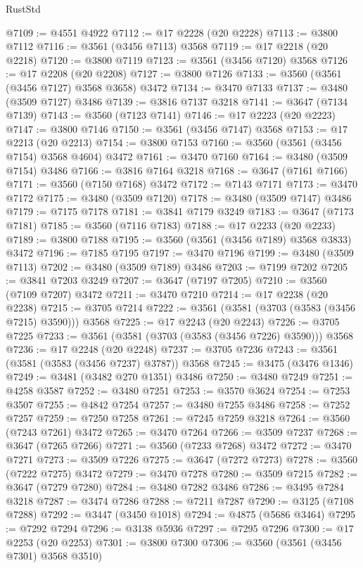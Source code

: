 \begin{lexlean}{RustStd}
\begin{coremodule}
@7109 := @4551 @4922
@7112 := @17 @2228 (@20 @2228)
@7113 := @3800 @7112
@7116 := @3561 (@3456 @7113) @3568
@7119 := @17 @2218 (@20 @2218)
@7120 := @3800 @7119
@7123 := @3561 (@3456 @7120) @3568
@7126 := @17 @2208 (@20 @2208)
@7127 := @3800 @7126
@7133 := @3560 (@3561 (@3456 @7127) @3568 @3658) @3472
@7134 := @3470 @7133
@7137 := @3480 (@3509 @7127) @3486
@7139 := @3816 @7137 @3218
@7141 := @3647 (@7134 @7139)
@7143 := @3560 (@7123 @7141)
@7146 := @17 @2223 (@20 @2223)
@7147 := @3800 @7146
@7150 := @3561 (@3456 @7147) @3568
@7153 := @17 @2213 (@20 @2213)
@7154 := @3800 @7153
@7160 := @3560 (@3561 (@3456 @7154) @3568 @4604) @3472
@7161 := @3470 @7160
@7164 := @3480 (@3509 @7154) @3486
@7166 := @3816 @7164 @3218
@7168 := @3647 (@7161 @7166)
@7171 := @3560 (@7150 @7168) @3472
@7172 := @7143 @7171
@7173 := @3470 @7172
@7175 := @3480 (@3509 @7120)
@7178 := @3480 (@3509 @7147) @3486
@7179 := @7175 @7178
@7181 := @3841 @7179 @3249
@7183 := @3647 (@7173 @7181)
@7185 := @3560 (@7116 @7183)
@7188 := @17 @2233 (@20 @2233)
@7189 := @3800 @7188
@7195 := @3560 (@3561 (@3456 @7189) @3568 @3833) @3472
@7196 := @7185 @7195
@7197 := @3470 @7196
@7199 := @3480 (@3509 @7113)
@7202 := @3480 (@3509 @7189) @3486
@7203 := @7199 @7202
@7205 := @3841 @7203 @3249
@7207 := @3647 (@7197 @7205)
@7210 := @3560 (@7109 @7207) @3472
@7211 := @3470 @7210
@7214 := @17 @2238 (@20 @2238)
@7215 := @3705 @7214
@7222 := @3561 (@3581 (@3703 (@3583 (@3456 @7215) @3590))) @3568
@7225 := @17 @2243 (@20 @2243)
@7226 := @3705 @7225
@7233 := @3561 (@3581 (@3703 (@3583 (@3456 @7226) @3590))) @3568
@7236 := @17 @2248 (@20 @2248)
@7237 := @3705 @7236
@7243 := @3561 (@3581 (@3583 (@3456 @7237) @3787)) @3568
@7245 := @3475 (@3476 @1346)
@7249 := @3481 (@3482 @270 @1351) @3486
@7250 := @3480 @7249
@7251 := @4258 @3587
@7252 := @3480 @7251
@7253 := @3570 @3624
@7254 := @7253 @3507
@7255 := @4842 @7254
@7257 := @3480 @7255 @3486
@7258 := @7252 @7257
@7259 := @7250 @7258
@7261 := @7245 @7259 @3218
@7264 := @3560 (@7243 @7261) @3472
@7265 := @3470 @7264
@7266 := @3509 @7237
@7268 := @3647 (@7265 @7266)
@7271 := @3560 (@7233 @7268) @3472
@7272 := @3470 @7271
@7273 := @3509 @7226
@7275 := @3647 (@7272 @7273)
@7278 := @3560 (@7222 @7275) @3472
@7279 := @3470 @7278
@7280 := @3509 @7215
@7282 := @3647 (@7279 @7280)
@7284 := @3480 @7282 @3486
@7286 := @3495 @7284 @3218
@7287 := @3474 @7286
@7288 := @7211 @7287
@7290 := @3125 (@7108 @7288)
@7292 := @3447 (@3450 @1018)
@7294 := @4875 (@5686 @3464)
@7295 := @7292 @7294
@7296 := @3138 @5936
@7297 := @7295 @7296
@7300 := @17 @2253 (@20 @2253)
@7301 := @3800 @7300
@7306 := @3560 (@3561 (@3456 @7301) @3568 @3510)

\end{coremodule}
\end{lexlean}
